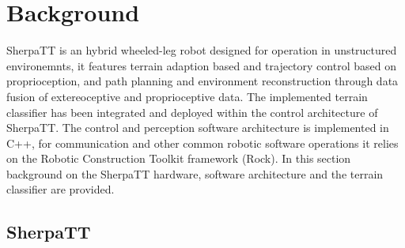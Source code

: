 \documentclass{article}
\begin{document}

\section{Background}


SherpaTT is an hybrid wheeled-leg robot designed for operation in unstructured environemnts, it features terrain adaption based and trajectory control based on proprioception, and path planning and environment reconstruction through data fusion of extereoceptive and proprioceptive data.
The implemented terrain classifier has been integrated and deployed within the control architecture of SherpaTT. 
The control and perception software architecture is implemented in C++, for communication and other common robotic software operations it relies on the Robotic Construction Toolkit framework (Rock). 
In this section background on the SherpaTT hardware, software architecture and the terrain classifier are provided.


\subsection{SherpaTT}

\end{document}
